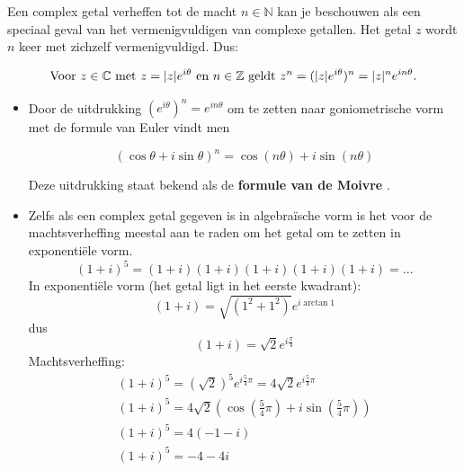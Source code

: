 Een complex getal verheffen tot de macht $n \in \mathbb{N}$ kan je beschouwen als een speciaal geval van het vermenigvuldigen van complexe getallen. Het getal $z$ wordt $n$ keer met zichzelf vermenigvuldigd. Dus:\\

\begin{definitie}
	\begin{framed}
\begin{equation*}
\text{Voor } z \in \mathbb{C} \text{ met } z = |z|e^{i\theta} \text{ en } n \in \mathbb{Z} \text{ geldt } \\
z^n = (|z|e^{i \theta})^n = |z|^n e^{i n \theta}.
\end{equation*}
\end{framed}
\end{definitie}
%
%
%

\begin{opmerking}
	

\begin{itemize}
	\item Door de uitdrukking $(e^{i \theta})^n = e^{i n \theta}$ om te zetten naar goniometrische vorm met de formule van Euler vindt men
	\begin{eigenschap}
		\[  (\cos \theta + i \sin \theta)^n = \cos (n\theta)+i \sin(n \theta) \]
	\end{eigenschap}
	Deze uitdrukking staat bekend als de {\bf formule van de Moivre }. 
	\item Zelfs als een complex getal gegeven is in algebra\"{i}sche vorm is het voor de machtsverheffing meestal aan te raden om het getal om te zetten in exponenti\"{e}le vorm.\\
	\[ (1+i)^5 = (1+i)(1+i)(1+i)(1+i)(1+i)=... \]
	In exponenti\"{e}le vorm (het getal ligt in het eerste kwadrant):\\
	\[ (1+i) = \sqrt{(1^2 + 1^2)} e^{i \arctan{1}}    \]
	dus
	\[  (1+i)= \sqrt{2} e^{i \frac{\pi}{4}} \]
	Machtsverheffing:
	\[ \begin{array}{l} (1+i)^5 = (\sqrt{2})^5 e^{i \frac{5}{4} \pi}= 4\sqrt{2}e^{i \frac{5}{4} \pi} \\
	(1+i)^5 = 4\sqrt{2} (\cos(\frac{5}{4} \pi)+i\sin(\frac{5}{4} \pi)) \\
	(1+i)^5 = 4 (-1 -i) \\
	(1+i)^5 = -4-4i \end{array}  \]
	
\end{itemize}

\end{opmerking}
